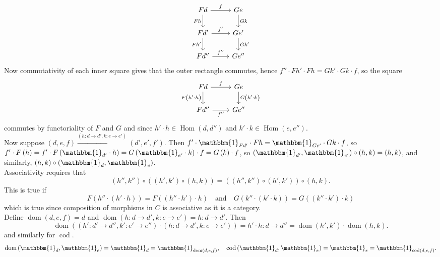 \documentclass[a4paper]{article}
\theoremstyle{plain}%
\theoremstyle{definition}
\theoremstyle{remark}
\DeclareMathOperator{\Hom}{Hom}
\DeclareMathOperator{\dom}{dom}
\DeclareMathOperator{\cod}{cod}
\begin{document}
\begin{equation*}
\begin{tikzcd}
    Fd \ar[d, "Fh"'] \ar[r, "f"] & Ge \ar[d, "Gk"]\\
    Fd' \ar[r, "f'"] \ar[d, "Fh'"'] & Ge' \ar[d, "Gk'"]\\
    Fd'' \ar[r, "f''"] & Ge''
\end{tikzcd}
\end{equation*}
Now commutativity of each inner square gives that the outer rectangle commutes,
hence
$f'' \cdot  Fh' \cdot  Fh = Gk' \cdot Gk \cdot f$, so the square
\begin{equation*}
\begin{tikzcd}
    Fd  \ar[d, "F \left( h' \cdot h \right)"'] \ar[r, "f"] & Ge \ar[d, "G \left( k' \cdot k \right)"] \\
    Fd'' \ar[r, "f''"'] & Ge''
\end{tikzcd}
\end{equation*}
commutes by functoriality of $F$ and $G$ and since
$h' \cdot h \in \Hom\left( d, d'' \right) $ and
$k' \cdot k \in \Hom \left( e,e'' \right) $.\\
\linebreak
Now suppose $\left(d, e, f \right) \stackrel{\left( h
 \colon d \to d', k  \colon e\to e' \right) }{\to } \left( d',e',f' \right) $.
 Then
$f' \cdot  \mathbbm{1}_{Fd'} \cdot Fh = \mathbbm{1}_{Ge'} \cdot Gk \cdot f$, so
$f' \cdot F\left( h \right)  =f' \cdot F\left( \mathbbm{1}_{d'} \cdot h \right) 
= G\left( \mathbbm{1}_{e'} \cdot k \right) \cdot f = G\left( k \right) \cdot
f$, so
$\left( \mathbbm{1}_{d'}, \mathbbm{1}_{e'} \right) \circ \left( h,k \right) 
= \left( h,k \right) $, and similarly,
$(h,k) \circ \left( \mathbbm{1}_d, \mathbbm{1}_e \right) $.\\
Associativity requires that
\[
    \left( h'', k'' \right) \circ \left( \left( h',k' \right) \circ \left( h,k
        \right) \right)
    = \left( \left( h'', k'' \right) \circ \left( h',k' \right)  \right) \circ
    \left( h,k \right).
\] 
This is true if
\[
F\left( h'' \cdot  \left( h' \cdot h \right)  \right) 
= F \left( \left( h'' \cdot h' \right) \cdot h \right) \quad \text{and} \quad
G\left( k'' \cdot \left( k' \cdot k \right)  \right) 
= G \left( \left( k'' \cdot k' \right) \cdot k \right) 
\] 
which is true since composition of morphisms in $C$ is associative as it is
a category.\\
\linebreak
Define
$\dom (d,e,f) = d$ and
$\dom \left( h  \colon d \to d', k  \colon e\to e' \right) =
h  \colon d\to d'$. Then
\[
    \dom \left( \left( h'  \colon d' \to d'', k'  \colon e' \to e'' \right) \cdot 
\left( h  \colon d \to d', k  \colon e \to e' \right) \right)
= h' \cdot h  \colon d \to d''
= \dom \left( h', k' \right) \cdot 
\dom \left( h,k \right) .
\]
and similarly for $\cod$.\\
\linebreak
\[
\dom \left( \mathbbm{1}_d, \mathbbm{1}_e \right) 
= \mathbbm{1}_d = \mathbbm{1}_{\dom \left( d,e,f \right) }, \quad \cod \left( \mathbbm{1}_d , \mathbbm{1}_e \right) 
= \mathbbm{1}_e = \mathbbm{1}_{\cod (d,e,f)}.
\] 
\end{document}
